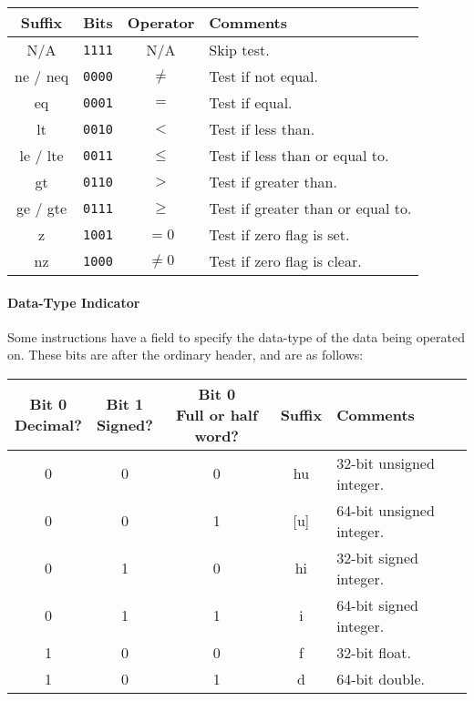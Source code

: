 \documentclass[10pt]{article}
\begin{document}
    \medskip
    \begin{tabular}{|c|c|c|l|}
        \hline
        \textbf{Suffix} & \textbf{Bits} & \textbf{Operator} & \textbf{Comments} \\
        \hline
        N/A & \texttt{1111} & N/A & Skip test. \\
        \hline
        ne / neq & \texttt{0000} & \(\neq\) & Test if not equal. \\
        eq & \texttt{0001} & \(=\) & Test if equal. \\
        \hline
        lt & \texttt{0010} & \(<\) & Test if less than. \\
        le / lte & \texttt{0011} & \(\le\) & Test if less than or equal to. \\
        \hline
        gt & \texttt{0110} & \(>\) & Test if greater than. \\
        ge / gte & \texttt{0111} & \(\ge\) & Test if greater than or equal to. \\
        \hline
        z & \texttt{1001} & \(= 0\) & Test if zero flag is set. \\
        nz & \texttt{1000} & \(\neq 0\) & Test if zero flag is clear. \\
        \hline
    \end{tabular}

    \paragraph{Data-Type Indicator}
    Some instructions have a field to specify the data-type of the data being operated on.
    These bits are after the ordinary header, and are as follows:

    \bigskip
    \begin{tabular}{|c|c|c||c|l|}
        \hline
        \makecell[c]{\textbf{Bit 0}\\Decimal?} & \makecell[c]{\textbf{Bit 1}\\Signed?} & \makecell[c]{\textbf{Bit 0}\\Full or half word?} & \textbf{Suffix} & \textbf{Comments} \\
        \hline
        0 & 0 & 0 & hu & 32-bit unsigned integer. \\
        \hline
        0 & 0 & 1 & [u] & 64-bit unsigned integer. \\
        \hline
        0 & 1 & 0 & hi & 32-bit signed integer. \\
        \hline
        0 & 1 & 1 & i & 64-bit signed integer. \\
        \hline
        1 & 0 & 0 & f & 32-bit float. \\
        \hline
        1 & 0 & 1 & d & 64-bit double. \\
        \hline
    \end{tabular}
\end{document}
